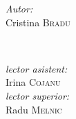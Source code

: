 \documentclass[11pt]{article}
\begin{document}
\begin{titlepage}
\begin{center}
      \begin{minipage}{0.4\textwidth}
      \begin{flushleft} \large
      \emph{Autor:}\\
      Cristina \textsc{Bradu}
      \end{flushleft}
      \end{minipage}
      ~
      \begin{minipage}{0.4\textwidth}
      \begin{flushright} \large
      \emph{lector asistent:} \\
      Irina \textsc{Cojanu} \\ %
      \emph{lector superior:} \\
      Radu \textsc{Melnic} %
      \end{flushright}
      \end{minipage}\\[4cm]

      \vspace{5 mm}






      \vfill %
      \end{center}
      
\end{titlepage}
\end{document}
